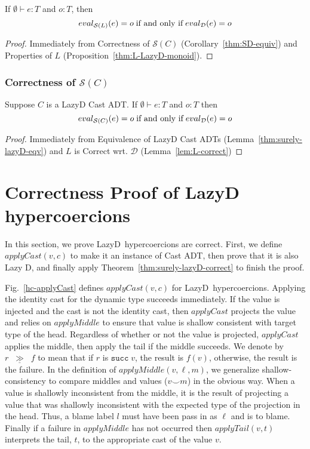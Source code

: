 \documentclass[acmsmall,review]{acmart}\settopmatter{printfolios=true,printccs=false,printacmref=false}
\newcommand{\mbind}{\ensuremath{\;\underline{\gg}\;}}
\newcommand{\figref}[1]{Fig.~\ref{#1}}
\newcommand{\judgetype}[3]{#1 \vdash #2 : #3}
\newcommand{\lazyD}{Lazy\;D}
\newcommand{\rOOsucc}[1]{\mathtt{succ}\;#1}
\newcommand{\ineffCEKD}{\ensuremath{\mathcal{D}}}
\newcommand{\effCEK}[1]{\ensuremath{\mathcal{S}(#1)}}
\newcommand{\evalEqv}[2]{
	\ensuremath{
		eval_{\text{#1}}(e) = o
		\;\text{if and only if}\;
		eval_{\text{#2}}(e) = o}
}
\begin{document}
\begin{lemma}[$L$ is Correct wrt. \ineffCEKD]
  \label{lem:L-correct}
  If $\judgetype{\emptyset}{e}{T}$ and $o : T$, then
  \[
  \text{\evalEqv{\effCEK{L}}{\ineffCEKD}}
  \]
\end{lemma}
\begin{proof}
  Immediately from
  Correctness of \effCEK{C} (Corollary~\ref{thm:SD-equiv}) and 
  Properties of $L$ (Proposition~\ref{thm:L-LazyD-monoid}).
\end{proof}

\subsubsection{Correctness of \effCEK{C}}

\begin{theorem}[\effCEK{C} is Correct wrt. \ineffCEKD{}]
  \label{thm:surely-lazyD-correct}
  Suppose $C$ is a \lazyD{} Cast ADT.  If
  $\judgetype{\emptyset}{e}{T}$ and $o : T$ then
  \[
  \evalEqv{\effCEK{C}}{\ineffCEKD}
  \]
\end{theorem}
\begin{proof}
	Immediately from 
	Equivalence of \lazyD{} Cast ADTs (Lemma~\ref{thm:surely-lazyD-eqv})
	and
	$L$ is Correct wrt. \ineffCEKD{} (Lemma~\ref{lem:L-correct})
\end{proof}


\section{Correctness Proof of \lazyD{} hypercoercions}
\label{sec:hypercoercion-correctness}

In this section, we prove \lazyD\ hypercoercions are 
correct. First, we define $applyCast(v,c)$ to make it an instance of Cast ADT, 
then prove that it is also Lazy D, and finally apply 
Theorem~\ref{thm:surely-lazyD-correct} to finish the proof.

\figref{hc-applyCast} defines $applyCast(v,c)$ for \lazyD\ hypercoercions.
Applying the identity cast for the dynamic type succeeds immediately. If the
value is injected and the cast is not the identity cast, then $applyCast$
projects the value and relies on $applyMiddle$ to ensure that value is shallow
consistent with target type of the head. Regardless of whether or not the value
is projected, $applyCast$ applies the middle, then apply the tail if the middle
succeeds. We denote by $r \; \mbind{} \; f$ to mean that if $r$ is 
$\rOOsucc{v}$, the
result is $f(v)$, otherwise, the result is the failure. In the definition of
$applyMiddle(v,\ell,m)$, we generalize shallow-consistency to compare middles
and values ($v \smile m$) in the obvious way. When a value is shallowly
inconsistent from the middle, it is the result of projecting a value that was
shallowly inconsistent with the expected type of the projection in the head. Thus, a
blame label $l$ must have been pass in as $\ell$ and is to blame. Finally if a
failure in $applyMiddle$ has not occurred then $applyTail(v, t)$ interprets the
tail, $t$, to the appropriate cast of the value $v$.
\end{document}
